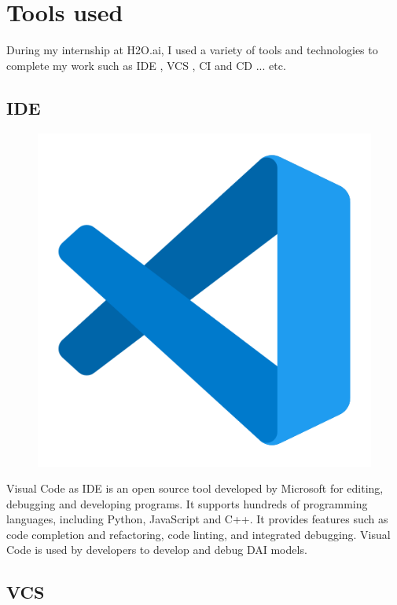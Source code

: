 \documentclass[12pt,a4paper]{report}
\begin{document}
\section{Tools used}

During my internship at H2O.ai, I used a variety of tools and technologies to complete my work such as \ac{IDE} , \ac{VCS} , \ac{CI} and \ac{CD} ... etc. 

\subsection{\ac{IDE}}

\begin{figure}
\includegraphics[width=1\linewidth]{vscode.png} 
\end{figure}

Visual Code\cite{noauthor_visual_nodate} as \ac{IDE} is an open source tool developed by Microsoft for editing, debugging and developing programs. It supports hundreds of programming languages, including Python, JavaScript and C++. It provides features such as code completion and refactoring, code linting, and integrated debugging. Visual Code is used by developers to develop and debug \ac{DAI} models.
\\

\subsection{\ac{VCS}}
\end{document}
